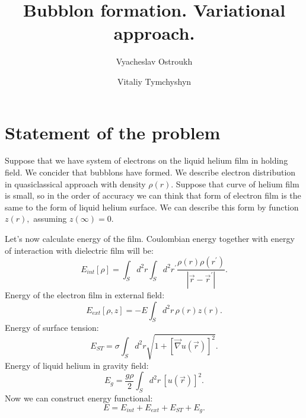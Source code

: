 \documentclass[10pt]{article}
\title{Bubblon formation. Variational approach.}
\author{Vyacheslav Ostroukh}
\author{Vitaliy Tymchyshyn}
\begin{document}



\section{Statement of the problem}

Suppose that we have system of electrons on the liquid helium film in holding field.
We concider that bubblons have formed.
We describe electron distribution in quasiclassical approach with density $\rho(r).$
Suppose that curve of helium film is small, so in the order of accuracy we can think that form of electron film is the same to the form of liquid helium surface.
We can describe this form by function $z(r),$ assuming $z(\infty)=0.$

Let's now calculate energy of the film.
Coulombian energy together with energy of interaction with dielectric film will be:
\begin{equation}
    E_{int} [\rho] = \int_S d^2 r \int_S d^2 r^{\prime} \frac{\rho(r) \rho(r^{\prime})}{|\vec{r} - \vec{r}^{\prime}|}.
\end{equation}
Energy of the electron film in external field:
\begin{equation}
  E_{ext} [\rho,z] = -E \int_S d^2 r \, \rho(r) z(r).
\end{equation}
Energy of surface tension:
\begin{equation}
  E_{ST} = \sigma \int_S d^2 r \sqrt{ 1 + \left[ \vec{\nabla} u(\vec{r}) \right]^2 }.
\end{equation}
Energy of liquid helium in gravity field:
\begin{equation}
  E_g = \frac{g \rho}{2} \int_S d^2 r \, [u(\vec{r})]^2 .
\end{equation}
Now we can construct energy functional:
\begin{equation}
  E = E_{int} + E_{ext} + E_{ST} + E_g.
\end{equation}
\end{document}
